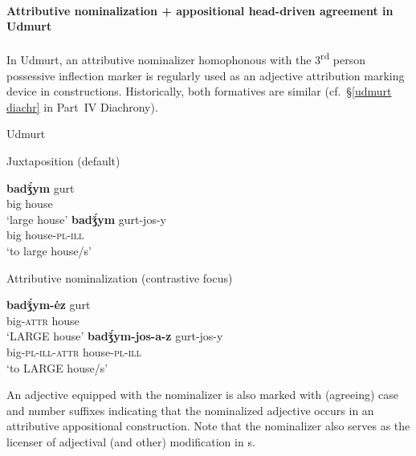 \paragraph*{Attributive nominalization + appositional head\hyp{}driven agreement in Udmurt}
\label{udmurt synchr}
In Udmurt, an attributive nominalizer homophonous with the 3\textsuperscript{rd} person possessive inflection marker is regularly used as an adjective attribution marking device in  constructions. Historically, both formatives are similar (cf.~\S\ref{udmurt diachr} in Part~IV Diachrony).
\begin{exe}
\ex \rm{Udmurt \citep{winkler2001}}
\begin{xlist}
\ex \rm{Juxtaposition (default)}
\begin{xlist}
\ex
\gll	\textbf{badǯ́ym} gurt\\
	big house\\
\glt	‘large house’
\ex	
\gll	\textbf{badǯ́ym} gurt-jos-y\\
	big house-\textsc{pl}-\textsc{ill}\\
\glt	‘to large house/s’
\end{xlist}
\ex \rm{Attributive nominalization (contrastive focus)}
\begin{xlist}
\ex
\gll	\textbf{badǯ́ym-ėz} gurt\\
	big-\textsc{attr} house\\
\glt	‘LARGE house’
\ex	
\gll	\textbf{badǯ́ym-jos-a-z} gurt-jos-y\\
	big-\textsc{pl}-\textsc{ill}-\textsc{attr} house-\textsc{pl}-\textsc{ill}\\
\glt	‘to LARGE house/s’
\end{xlist}
\end{xlist}
\end{exe}
An adjective equipped with the nominalizer is also marked with (agreeing) case and number suffixes indicating that the nominalized adjective occurs in an attributive appositional construction. Note that the nominalizer also serves as the licenser of adjectival (and other) modification in s.
